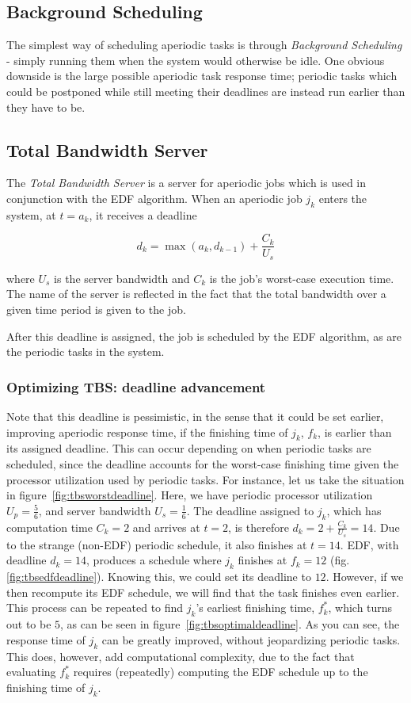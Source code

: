 \subsection{Background Scheduling}
The simplest way of scheduling aperiodic tasks is through \emph{Background Scheduling} - simply running them when the system would otherwise be idle. One obvious downside is the large possible aperiodic task response time; periodic tasks which could be postponed while still meeting their deadlines are instead run earlier than they have to be.

\subsection{Total Bandwidth Server}
The \emph{Total Bandwidth Server} is a server for aperiodic jobs which is used in conjunction with the EDF algorithm. When an aperiodic job $j_k$ enters the system, at $t = a_k$, it receives a deadline

\begin{equation}
    d_k = \max(a_k, d_{k-1}) + \frac{C_k}{U_s}
\end{equation}

where $U_s$ is the server bandwidth and $C_k$ is the job's worst-case execution time. The name of the server is reflected in the fact that the total bandwidth over a given time period is given to the job.

After this deadline is assigned, the job is scheduled by the EDF algorithm, as are the periodic tasks in the system.

\subsubsection{Optimizing TBS: deadline advancement}
Note that this deadline is pessimistic, in the sense that it could be set earlier, improving aperiodic response time, if the finishing time of $j_k$, $f_k$, is earlier than its assigned deadline. This can occur depending on when periodic tasks are scheduled, since the deadline accounts for the worst-case finishing time given the processor utilization used by periodic tasks. For instance, let us take the situation in figure~\ref{fig:tbsworstdeadline}. Here, we have periodic processor utilization $U_p = \frac{5}{6}$, and server bandwidth $U_s = \frac{1}{6}$. The deadline assigned to $j_k$, which has computation time $C_k = 2$ and arrives at $t = 2$, is therefore $d_k = 2 + \frac{C_k}{U_s} = 14$. Due to the strange (non-EDF) periodic schedule, it also finishes at $t = 14$. EDF, with deadline $d_k = 14$, produces a schedule where $j_k$ finishes at $f_k = 12$ (fig. \ref{fig:tbsedfdeadline}). Knowing this, we could set its deadline to $12$. However, if we then recompute its EDF schedule, we will find that the task finishes even earlier. This process can be repeated to find $j_k$'s earliest finishing time, $f^*_k$, which turns out to be $5$, as can be seen in figure~\ref{fig:tbsoptimaldeadline}. As you can see, the response time of $j_k$ can be greatly improved, without jeopardizing periodic tasks. This does, however, add computational complexity, due to the fact that evaluating $f^*_k$ requires (repeatedly) computing the EDF schedule up to the finishing time of $j_k$.

